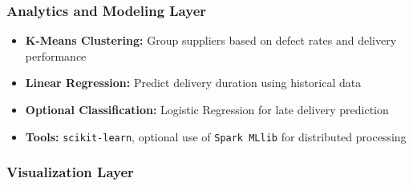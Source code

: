\documentclass[10pt, twocolumn]{article}
\begin{document}
\vspace{1em}

\subsubsection{Analytics and Modeling Layer}

\begin{itemize}
    \item \textbf{K-Means Clustering:} Group suppliers based on defect rates and delivery performance
    \item \textbf{Linear Regression:} Predict delivery duration using historical data
    \item \textbf{Optional Classification:} Logistic Regression for late delivery prediction
    \item \textbf{Tools:} \texttt{scikit-learn}, optional use of \texttt{Spark MLlib} for distributed processing
\end{itemize}

\vspace{1em}

\subsubsection{Visualization Layer}
\end{document}
